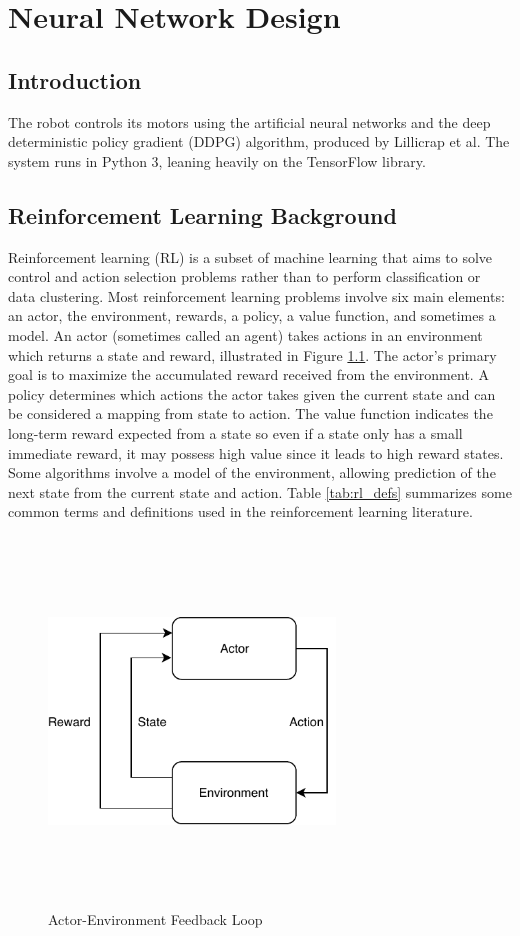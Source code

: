 \chapter{Neural Network Design}
\section{Introduction}
The robot controls its motors using the artificial neural networks and the deep deterministic policy gradient (DDPG) algorithm, produced by Lillicrap et al. The system runs in Python 3, leaning heavily on the TensorFlow library.

\section{Reinforcement Learning Background}
Reinforcement learning (RL) is a subset of machine learning that aims to solve control and action selection problems rather than to perform classification or data clustering. Most reinforcement learning problems involve six main elements: an actor, the environment, rewards, a policy, a value function, and sometimes a model. An actor (sometimes called an agent) takes actions in an environment which returns a state and reward, illustrated in Figure \ref{fig:actor_env_loop}. The actor's primary goal is to maximize the accumulated reward received from the environment. A policy determines which actions the actor takes given the current state and can be considered a mapping from state to action. The value function indicates the long-term reward expected from a state so even if a state only has a small immediate reward, it may possess high value since it leads to high reward states. Some algorithms involve a model of the environment, allowing prediction of the next state from the current state and action. Table \ref{tab:rl_defs} summarizes some common terms and definitions used in the reinforcement learning literature.
\begin{figure}[H]   %
	\centering \includegraphics[width=3in, height=3.85in, keepaspectratio]{figures/actor_env_loop.pdf}
	\caption{Actor-Environment Feedback Loop}\label{fig:actor_env_loop}
\end{figure}
